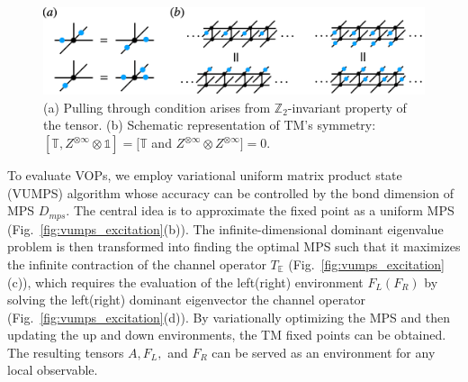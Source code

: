 \documentclass{ntuthesis}
\newcommand{\citep}{\cite}
\begin{document}
\begin{figure}[h]
 \centering
\includegraphics[width=\linewidth]{tm_sym}
\caption{(a) Pulling through condition arises from $\mathbb{Z}_2$-invariant property of the tensor. (b) Schematic representation of TM's symmetry: $[\mathbb{T}, Z^{\otimes \infty} \otimes \mathbb{1}] = [\mathbb{T}$ and  $Z^{\otimes \infty}\otimes Z^{\otimes \infty} ]  = 0$.} 
\label{fig:tm_sym}
\end{figure}

%
To evaluate VOPs, we employ variational uniform matrix product state (VUMPS) algorithm \citep{2018_vumps, 2018_faster_method, 2019_tangent_space_lecture} whose accuracy can be controlled by the bond dimension of MPS $D_{mps}$.
%
The central idea is to approximate the fixed point as a uniform MPS (Fig.~\ref{fig:vumps_excitation}(b)). The infinite-dimensional dominant eigenvalue problem is then transformed into finding the optimal MPS such that it maximizes the infinite contraction of the channel operator $T_\mathbb{E}$ (Fig.~\ref{fig:vumps_excitation}(c)), which requires the evaluation of the left(right) environment $F_L(F_R)$ by solving the left(right) dominant eigenvector the channel operator (Fig.~\ref{fig:vumps_excitation}(d)). By variationally optimizing the MPS and then updating the up and down environments, the TM fixed points can be obtained. The resulting tensors $A,F_L,$ and $F_R$ can be served as an environment for any local observable. 
\end{document}
